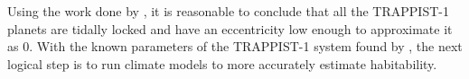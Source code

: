 Using the work done by \citet{dynamicsfate}, it is reasonable to conclude that
 all the TRAPPIST-1 planets are tidally locked and have an eccentricity low
 enough to approximate it as 0. With the known parameters of the TRAPPIST-1
 system found by \citet{trappistdiscovery}, the next logical step is to run
 climate models to more accurately estimate habitability.
